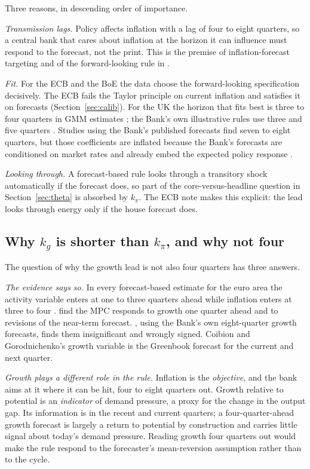 \documentclass[11pt,a4paper]{article}
\begin{document}
Three reasons, in descending order of importance.

\emph{Transmission lags.} Policy affects inflation with a lag of four to eight quarters, so a central bank that cares about inflation at the horizon it can influence must respond to the forecast, not the print. This is the premise of inflation-forecast targeting and of the forward-looking rule in \textcite{cgg1998,cgg2000}.

\emph{Fit.} For the ECB and the BoE the data choose the forward-looking specification decisively. The ECB fails the Taylor principle on current inflation and satisfies it on forecasts (Section~\ref{sec:calib}). For the UK the horizon that fits best is three to four quarters in GMM estimates \parencite{cobhamkang2013}; the Bank's own illustrative rules use three and five quarters \parencite{boe2025mpr}. Studies using the Bank's published forecasts find seven to eight quarters, but those coefficients are inflated because the Bank's forecasts are conditioned on market rates and already embed the expected policy response \parencite{goodhart2005}.

\emph{Looking through.} A forecast-based rule looks through a transitory shock automatically if the forecast does, so part of the core-versus-headline question in Section~\ref{sec:theta} is absorbed by $k_\pi$. The ECB note makes this explicit: the lead looks through energy only if the house forecast does.

\subsection{Why $k_g$ is shorter than $k_\pi$, and why not four}

The question of why the growth lead is not also four quarters has three answers.

\emph{The evidence says so.} In every forecast-based estimate for the euro area the activity variable enters at one to three quarters ahead while inflation enters at three to four \parencite{paloviita2021,gorter2008,hartmannsmets2018}. \textcite{cloyne2016} find the MPC responds to growth one quarter ahead and to revisions of the near-term forecast. \textcite{goodhart2005}, using the Bank's own eight-quarter growth forecasts, finds them insignificant and wrongly signed. Coibion and Gorodnichenko's growth variable is the Greenbook forecast for the current and next quarter.

\emph{Growth plays a different role in the rule.} Inflation is the \emph{objective}, and the bank aims at it where it can be hit, four to eight quarters out. Growth relative to potential is an \emph{indicator} of demand pressure, a proxy for the change in the output gap. Its information is in the recent and current quarters; a four-quarter-ahead growth forecast is largely a return to potential by construction and carries little signal about today's demand pressure. Reading growth four quarters out would make the rule respond to the forecaster's mean-reversion assumption rather than to the cycle.
\end{document}
